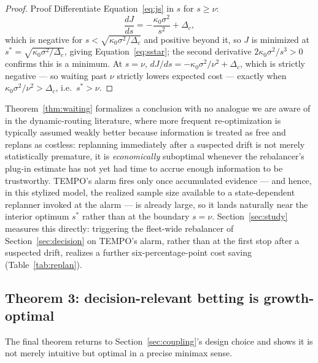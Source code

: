 \documentclass[trsc,dblanonrev]{informs4}
\begin{document}
\begin{proof}{Proof}
Differentiate Equation~\eqref{eq:js} in $s$ for $s \ge \nu$:
\[
\frac{dJ}{ds} = -\frac{\kappa_0\sigma^2}{s^2} + \Delta_c,
\]
which is negative for $s < \sqrt{\kappa_0\sigma^2/\Delta_c}$ and
positive beyond it, so $J$ is minimized at $s^\ast =
\sqrt{\kappa_0\sigma^2/\Delta_c}$, giving
Equation~\eqref{eq:sstar}; the second derivative
$2\kappa_0\sigma^2/s^3 > 0$ confirms this is a minimum. At $s = \nu$,
$dJ/ds = -\kappa_0\sigma^2/\nu^2 + \Delta_c$, which is strictly negative
--- so waiting past $\nu$ strictly lowers expected cost --- exactly when
$\kappa_0\sigma^2/\nu^2 > \Delta_c$, i.e.\ $s^\ast > \nu$. \Halmos
\end{proof}

Theorem~\ref{thm:waiting} formalizes a conclusion with no analogue we
are aware of in the dynamic-routing literature, where more frequent
re-optimization is typically assumed weakly better because information
is treated as free and replans as costless: replanning immediately
after a suspected drift is not merely statistically premature, it is
\emph{economically} suboptimal whenever the rebalancer's plug-in
estimate has not yet had time to accrue enough information to be
trustworthy. TEMPO's alarm fires only once accumulated evidence ---
and hence, in this stylized model, the realized sample size available
to a state-dependent replanner invoked at the alarm --- is already
large, so it lands naturally near the interior optimum $s^\ast$ rather
than at the boundary $s = \nu$. Section~\ref{sec:study} measures this
directly: triggering the fleet-wide rebalancer of
Section~\ref{sec:decision} on TEMPO's alarm, rather than at the first
stop after a suspected drift, realizes a further six-percentage-point
cost saving (Table~\ref{tab:replan}).

\subsection{Theorem 3: decision-relevant betting is growth-optimal}

The final theorem returns to Section~\ref{sec:coupling}'s design choice
and shows it is not merely intuitive but optimal in a precise
minimax sense.
\end{document}
